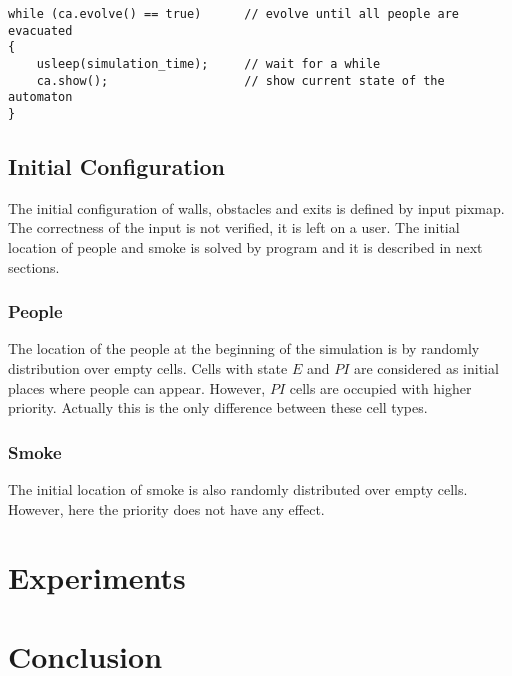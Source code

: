 \bigskip
\begin{lstlisting}
while (ca.evolve() == true)      // evolve until all people are evacuated
{
    usleep(simulation_time);     // wait for a while
    ca.show();                   // show current state of the automaton
}
\end{lstlisting}

\subsection{Initial Configuration}
The initial configuration of walls, obstacles and exits is defined by input
pixmap. The correctness  of the input is not verified, it is left on a user.
The initial location of people and smoke is solved by program and it is
described in next sections.

\subsubsection{People}
The location of the people at the beginning of the simulation is by randomly
distribution over empty cells. Cells with state $E$ and $PI$ are considered as
initial places where people can appear. However, $PI$ cells are occupied with
higher priority. Actually this is the only difference between these cell types.

\subsubsection{Smoke}
The initial location of smoke is also randomly distributed over empty cells.
However, here the priority does not have any effect.


\section{Experiments}

\section{Conclusion}
